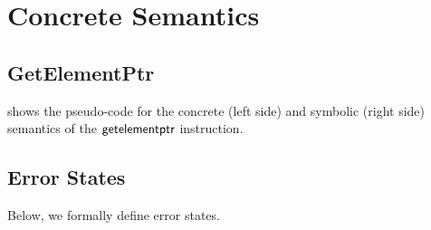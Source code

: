 \section{Concrete Semantics}

\subsection{GetElementPtr}
\label{appendix:gep}



 shows the pseudo-code for the concrete (left side) and symbolic (right side) semantics of the $\textsf{getelementptr}$ instruction.

\subsection{Error States}
\label{appendix:error-state}

Below, we formally define error states.

